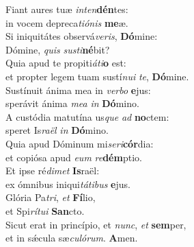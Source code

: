 \evenverse Fiant aures tuæ \textit{in}\textit{ten}\textbf{dén}tes:~\*\\
\evenverse in vocem depreca\textit{ti}\textit{ó}\textit{nis} \textbf{me}æ.\\
\oddverse Si iniquitátes observá\textit{ve}\textit{ris}, \textbf{Dó}mine:~\*\\
\oddverse Dómine, \textit{quis} \textit{su}\textit{sti}\textbf{né}bit?\\
\evenverse Quia apud te propiti\textit{á}\textit{ti}\textbf{o} est:~\*\\
\evenverse et propter legem tuam sustí\textit{nu}\textit{i} \textit{te}, \textbf{Dó}mine.\\
\oddverse Sustínuit ánima mea in \textit{ver}\textit{bo} \textbf{e}jus:~\*\\
\oddverse sperávit ánima \textit{me}\textit{a} \textit{in} \textbf{Dó}mino.\\
\evenverse A custódia matutína us\textit{que} \textit{ad} \textbf{no}ctem:~\*\\
\evenverse speret Is\textit{ra}\textit{ël} \textit{in} \textbf{Dó}mino.\\
\oddverse Quia apud Dóminum mi\textit{se}\textit{ri}\textbf{cór}dia:~\*\\
\oddverse et copiósa apud \textit{e}\textit{um} \textit{re}\textbf{dém}ptio.\\
\evenverse Et ipse ré\textit{di}\textit{met} \textbf{Is}raël:~\*\\
\evenverse ex ómnibus iniqui\textit{tá}\textit{ti}\textit{bus} \textbf{e}jus.\\
\oddverse Glória Pa\textit{tri}, \textit{et} \textbf{Fí}lio,~\*\\
\oddverse et Spi\textit{rí}\textit{tu}\textit{i} \textbf{San}cto.\\
\evenverse Sicut erat in princípio, et \textit{nunc}, \textit{et} \textbf{sem}per,~\*\\
\evenverse et in sǽcula sæ\textit{cu}\textit{ló}\textit{rum}. \textbf{A}men.\\
